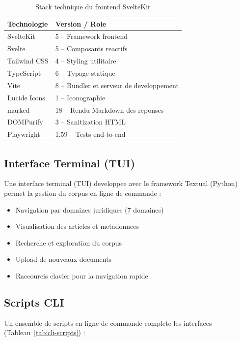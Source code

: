 \begin{table}[h]
\centering
\renewcommand{\arraystretch}{1.3}
\begin{tabular}{|l|l|}
\hline
\rowcolor{LightBlue}
\textbf{\color{PrimaryBlue}Technologie} & \textbf{\color{PrimaryBlue}Version / Role} \\
\hline
SvelteKit & 5 -- Framework frontend \\
Svelte & 5 -- Composants reactifs \\
Tailwind CSS & 4 -- Styling utilitaire \\
TypeScript & 6 -- Typage statique \\
Vite & 8 -- Bundler et serveur de developpement \\
Lucide Icons & 1 -- Iconographie \\
marked & 18 -- Rendu Markdown des reponses \\
DOMPurify & 3 -- Sanitization HTML \\
Playwright & 1.59 -- Tests end-to-end \\
\hline
\end{tabular}
\caption{Stack technique du frontend SvelteKit}
\label{tab:frontend-stack}
\end{table}

\subsection{Interface Terminal (TUI)}

Une interface terminal (TUI) developpee avec le framework Textual (Python) permet la gestion du corpus en ligne de commande :

\begin{itemize}
    \item Navigation par domaines juridiques (7 domaines)
    \item Visualisation des articles et metadonnees
    \item Recherche et exploration du corpus
    \item Upload de nouveaux documents
    \item Raccourcis clavier pour la navigation rapide
\end{itemize}

\subsection{Scripts CLI}

Un ensemble de scripts en ligne de commande complete les interfaces (Tableau~\ref{tab:cli-scripts}) :

